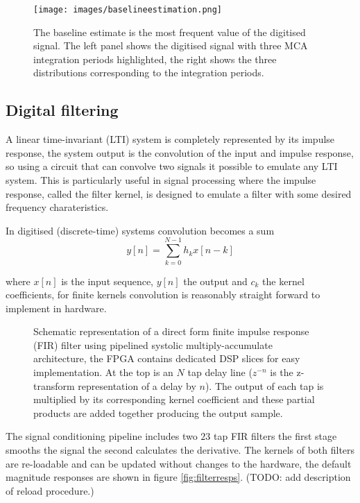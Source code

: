 \documentclass{article}
\begin{document}
\begin{figure}[!hpbt]
  \centering
  \texttt{[image: images/baselineestimation.png]}
  \caption{
    The baseline estimate is the most frequent value of the digitised signal.
    The left panel shows the digitised signal with three MCA integration periods
    highlighted, the right shows the three distributions corresponding to the
    integration periods.
  }
  \label{fig:baselineestimation}
\end{figure}

\clearpage


\subsection{Digital filtering}

A linear time-invariant (LTI) system is completely represented by its impulse
response, the system output is the convolution of the input and
impulse response, so using a circuit that can convolve two signals it possible
to emulate any LTI system. This is particularly useful in signal processing
where the impulse response, called the filter kernel, is designed to emulate a
filter with some desired frequency charateristics. 

In digitised (discrete-time) systems convolution becomes a sum
\begin{equation*}
  y[n]=\sum_{k=0}^{N-1}h_k x[n-k]
\end{equation*}
 
where $x[n]$ is the input sequence, $y[n]$ the output and $c_k$ the kernel
coefficients, for finite kernels convolution is reasonably straight
forward to implement in hardware.

\begin{figure}[!hpbt]
  \centering 
  
  \caption{
    Schematic representation of a direct form finite impulse response (FIR)
    filter using pipelined systolic multiply-accumulate architecture, the FPGA
    contains dedicated DSP slices for easy implementation.
    At the top is an $N$ tap delay line ($z^{-n}$ is the z-transform
    representation of a delay by $n$). The output of each tap is multiplied by
    its corresponding kernel coefficient and these partial products are added
    together producing the output sample. 
  }
  \label{fig:FIR}
\end{figure}

The signal conditioning pipeline includes two $23$ tap FIR filters the first
stage smooths the signal the second calculates the derivative. The kernels of
both filters are re-loadable and can be updated without changes to the
hardware, the default magnitude responses are shown in figure
\ref{fig:filterresps}. (TODO: add description of reload procedure.)
\end{document}
